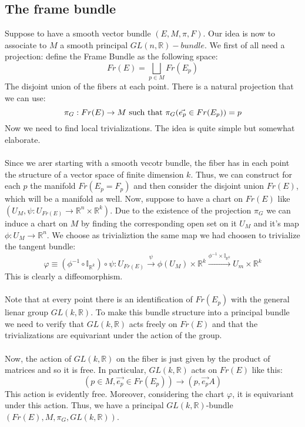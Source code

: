 \documentclass[12pt,a4paper]{report}
\theoremstyle{definition}
\theoremstyle{Theorem}
\theoremstyle{definition}
\theoremstyle{definition}
\theoremstyle{definition}
\begin{document}
		\subsection{The frame bundle}
		Suppose to have a smooth vector bundle $(E,M,\pi,F)$. Our idea is now to associate to $M$ a smooth principal $GL(n,\mathbb{R})-bundle$. We first of all need a projection: define the Frame Bundle as the following space:
		$$Fr(E)=\bigsqcup_{p\in M}Fr(E_p)$$
		The disjoint union of the fibers at each point. There is a natural projection that we can use:
		$$\pi_G:Fr(E)\rightarrow M\hbox{ such that } \pi_G(\vec{e_p}\in Fr(E_p))=p$$
		Now we need to find local trivializations. The idea is quite simple but somewhat elaborate.\\
		\\
		Since we arer starting with a smooth vecotr bundle, the fiber has in each point the structure of a vector space of finite dimension $k$. Thus, we can construct for each $p$ the manifold $Fr(E_p=F_p)$ and then consider the disjoint union $Fr(E)$, which will be a manifold as well. Now, suppose to have a chart on $Fr(E)$ like $(U_{M},\psi:U_{Fr(E)}\rightarrow \mathbb{R}^n\times\mathbb{R}^k)$. Due to the existence of the projection $\pi_G$ we can induce a chart on $M$ by finding the corresponding open set on it $U_M$ and it's map $\phi:U_M\rightarrow \mathbb{R}^n$. We choose as trivializtion the same map we had choosen to trivialize the tangent bundle:
		$$\varphi\equiv(\phi^{-1}\circ \mathbb{I}_{\mathbb{R}^k})\circ \psi: U_{Fr(E)}\xrightarrow{\psi}\phi(U_M)\times\mathbb{R}^k\xrightarrow{\phi^{-1}\times\mathbb{I}_{\mathbb{R}^k}}U_m\times\mathbb{R}^k$$
		This is clearly a diffeomorphism.\\
		\\
		Note that at every point there is an identification of $Fr(E_p)$ with the general lienar group $GL(k,\mathbb{R})$. To make this bundle structure into a principal bundle we need to verify that $GL(k,\mathbb{R})$ acts freely on $Fr(E)$ and that the trivializations are equivariant under the action of the group.\\
		\\
		Now, the action of $GL(k,\mathbb{R})$ on the fiber is just given by the product of matrices and so it is free. In particular, $GL(k,\mathbb{R})$ acts on $Fr(E)$ like this:
		$$(p\in M,\vec{e_p}\in Fr(E_p))\longrightarrow(p,\vec{e_p}A)$$
		This action is evidently free. Moreover, considering the chart $\varphi$, it is equivariant under this action. Thus, we have a principal $GL(k,\mathbb{R})$-bundle $(Fr(E),M,\pi_G,GL(k,\mathbb{R}))$.
\end{document}
